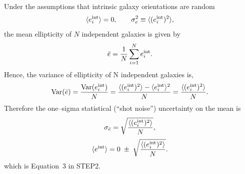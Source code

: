 \documentclass[11pt]{EuclidVIS}
\numberwithin{table}{section}
\numberwithin{figure}{section}
\begin{document}
Under the assumptions that intrinsic galaxy orientations are random
\begin{equation}
\langle e_i^{\rm int} \rangle = 0, 
\qquad 
\sigma_e^2 \equiv \langle (e_i^{\rm int})^2\rangle,
\end{equation}
the mean ellipticity of $N$ independent galaxies is given by
\begin{equation}
\bar e 
    = \frac{1}{N}\sum_{i=1}^N e_i^{\rm int}.
\end{equation}
Hence, the variance of ellipticity of N independent galaxies is,
\begin{equation}
{\rm Var}(\bar e)
    = \frac{{\rm Var}(e_i^{\rm int})}{N}
    = \frac{\langle (e_i^{\rm int})^2 \rangle 
            - \langle e_i^{\rm int} \rangle^2}{N}
    = \frac{\langle (e_i^{\rm int})^2\rangle}{N}.
\end{equation}
Therefore the one--sigma statistical (``shot noise'') uncertainty on the mean is
\begin{equation}
\sigma_{\bar e} 
    = \sqrt{\frac{\langle (e_i^{\rm int})^2 \rangle}{N}},
\end{equation}
\begin{equation}
\langle e^{\rm int} \rangle 
    = 0 \;\pm\; \sqrt{\frac{\langle (e_i^{\rm int})^2\rangle}{N}}.
\end{equation}
which is Equation~3 in STEP2.

\end{document}
